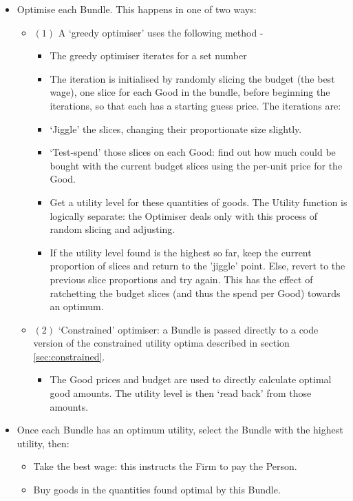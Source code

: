 \begin{itemize}
	\item Optimise each Bundle. This happens in one of two ways:
	\begin{itemize}
	\item $(1)$ A `greedy optimiser' uses the following method - 
\begin{itemize}
\item The greedy optimiser iterates for a set number 
	\item The iteration is initialised by randomly slicing the budget (the best wage), one slice for each Good in the bundle, before beginning the iterations, so that each has a starting guess price. The iterations are:
	\item `Jiggle' the slices, changing their proportionate size slightly.
	\item `Test-spend' those slices on each Good: find out how much could be bought with the current budget slices using the per-unit price for the Good.
	\item Get a utility level for these quantities of goods. The Utility function is logically separate: the Optimiser deals only with this process of random slicing and adjusting.
	\item If the utility level found is the highest so far, keep the current proportion of slices and return to the 'jiggle' point. Else, revert to the previous slice proportions and try again. This has the effect of ratchetting the budget slices (and thus the spend per Good) towards an optimum.
\end{itemize}
	\item $(2)$ `Constrained' optimiser: a Bundle is passed directly to a code version of the constrained utility optima described in section \ref{sec:constrained}.
	\begin{itemize}
	\item{The Good prices and budget are used to directly calculate optimal good amounts. The utility level is then `read back' from those amounts.}
	\end{itemize}
	\end{itemize}
	\item Once each Bundle has an optimum utility, select the Bundle with the highest utility, then:
	\begin{itemize}
	\item Take the best wage: this instructs the Firm to pay the Person.
	\item Buy goods in the quantities found optimal by this Bundle.
	\end{itemize}
\end{itemize}

